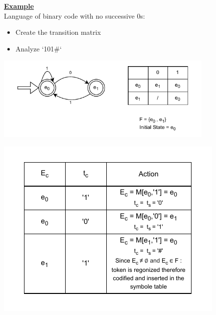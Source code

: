 \newpage

\textbf{\underline{Example}} \\[0.15cm]
Language of binary code with no successive 0s:
\begin{itemize}
    \item Create the transition matrix
    \item Analyze `101\#`
\end{itemize}

\begin{center}
    \includegraphics[width=0.8\textwidth]{Chapters/Examples/exalgo.drawio.pdf}
\end{center}

\vspace{0.5cm}

\begin{center}
    \includegraphics[height=0.5\textheight]{Chapters/Examples/exec.drawio.pdf}
\end{center}


